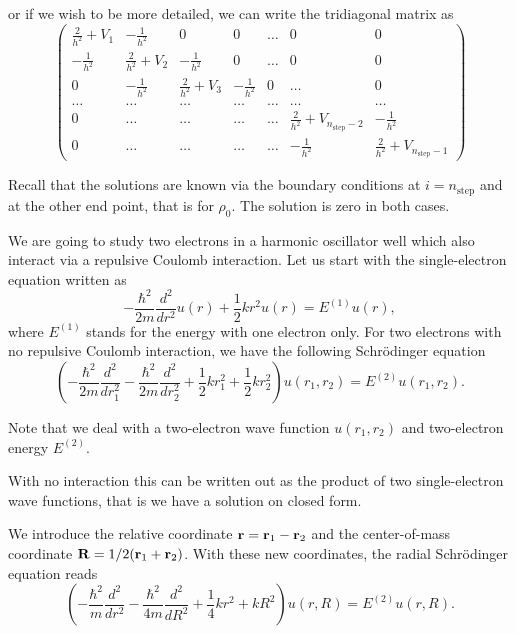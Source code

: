 or if we wish to be more detailed, we can write the tridiagonal matrix as
\begin{equation}
    \left( \begin{array}{ccccccc} \frac{2}{h^2}+V_1 & -\frac{1}{h^2} & 0   & 0    & \dots  &0     & 0 \\
                                -\frac{1}{h^2} & \frac{2}{h^2}+V_2 & -\frac{1}{h^2} & 0    & \dots  &0     &0 \\
                                0   & -\frac{1}{h^2} & \frac{2}{h^2}+V_3 & -\frac{1}{h^2}  &0       &\dots & 0\\
                                \dots  & \dots & \dots & \dots  &\dots      &\dots & \dots\\
                                0   & \dots & \dots & \dots  &\dots       &\frac{2}{h^2}+V_{n_{\mathrm{step}}-2} & -\frac{1}{h^2}\\
                                0   & \dots & \dots & \dots  &\dots       &-\frac{1}{h^2} & \frac{2}{h^2}+V_{n_{\mathrm{step}}-1}

             \end{array} \right)  
\label{eq:matrixse} 
\end{equation} 

Recall that the solutions are known via the boundary conditions at
$i=n_{\mathrm{step}}$ and at the other end point, that is for  $\rho_0$.
The solution is zero in both cases.



We are going to study two electrons in a harmonic oscillator well which
also interact via a repulsive Coulomb interaction.
Let us start with the single-electron equation written as
\[
  -\frac{\hbar^2}{2 m} \frac{d^2}{dr^2} u(r) 
       + \frac{1}{2}k r^2u(r)  = E^{(1)} u(r),
\]
where $E^{(1)}$ stands for the energy with one electron only.
For two electrons with no repulsive Coulomb interaction, we have the following 
Schr\"odinger equation
\[
\left(  -\frac{\hbar^2}{2 m} \frac{d^2}{dr_1^2} -\frac{\hbar^2}{2 m} \frac{d^2}{dr_2^2}+ \frac{1}{2}k r_1^2+ \frac{1}{2}k r_2^2\right)u(r_1,r_2)  = E^{(2)} u(r_1,r_2) .
\]

Note that we deal with a two-electron wave function $u(r_1,r_2)$ and 
two-electron energy $E^{(2)}$.

With no interaction this can be written out as the product of two
single-electron wave functions, that is we have a solution on closed form.

We introduce the relative coordinate ${\bf r} = {\bf r}_1-{\bf r}_2$
and the center-of-mass coordinate ${\bf R} = 1/2({\bf r}_1+{\bf r}_2)$.
With these new coordinates, the radial Schr\"odinger equation reads
\[
\left(  -\frac{\hbar^2}{m} \frac{d^2}{dr^2} -\frac{\hbar^2}{4 m} \frac{d^2}{dR^2}+ \frac{1}{4} k r^2+  kR^2\right)u(r,R)  = E^{(2)} u(r,R).
\]




